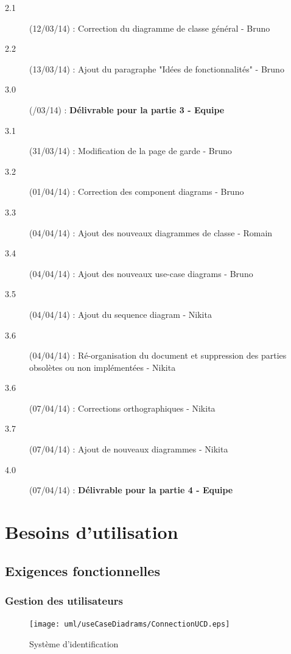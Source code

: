 \documentclass[a4paper]{report}
\begin{document}
\begin{description}
    \item[2.1] (12/03/14) : Correction du diagramme de classe général - Bruno
    \item[2.2] (13/03/14) : Ajout du paragraphe "Idées de fonctionnalités" - Bruno
    \item[3.0] (/03/14) : \textbf{Délivrable pour la partie 3 - Equipe}
    
    \item[3.1] (31/03/14) : Modification de la page de garde - Bruno
    \item[3.2] (01/04/14) : Correction des component diagrams - Bruno
    \item[3.3] (04/04/14) : Ajout des nouveaux diagrammes de classe - Romain
    \item[3.4] (04/04/14) : Ajout des nouveaux use-case diagrams - Bruno
    \item[3.5] (04/04/14) : Ajout du sequence diagram - Nikita
    \item[3.6] (04/04/14) : Ré-organisation du document et suppression des parties obsolètes ou non implémentées - Nikita
	\item[3.6] (07/04/14) : Corrections orthographiques - Nikita
	\item[3.7] (07/04/14) : Ajout de nouveaux diagrammes - Nikita
    
    \item[4.0] (07/04/14) : \textbf{Délivrable pour la partie 4 - Equipe}
    


\end{description}


\chapter{Besoins d'utilisation}
\section{Exigences fonctionnelles}

\subsection{Gestion des utilisateurs}

\begin{figure}[H]
    \begin{center}
        \texttt{[image: uml/useCaseDiadrams/ConnectionUCD.eps]}
        \caption{\label{diag-use-inscription} Système d'identification}
    \end{center}
\end{figure}
\end{document}
